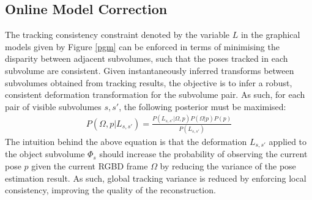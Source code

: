 \subsection{Online Model Correction}
\label{subsec:onlinemodelcorrection}

The tracking consistency constraint denoted by the variable $L$ in the graphical models given by Figure \ref{pgm} can 
be enforced in terms of minimising the disparity between adjacent subvolumes, such that the poses tracked in each subvolume are consistent.  
Given instantaneously inferred transforms between subvolumes obtained from tracking results, 
the objective is to infer a robust, consistent deformation transformation for the subvolume pair.
As such, for each pair of visible subvolumes $s, s'$, the following posterior must be maximised:
\begin{equation}
\begin{split}
P(\Omega, p | L_{s, s'}) = \frac{P(L_{s, s'} | \Omega, p) P(\Omega | p)P(p)}
{P(L_{s, s'})}
\end{split}
\end{equation}
The intuition behind the above equation is that the deformation $L_{s, s'}$ applied to the object subvolume $\Phi_{s}$ should 
increase the probability of observing the current pose $p$ given the current RGBD frame $\Omega$ by reducing the 
variance of the pose estimation result. As such, global tracking variance is reduced by enforcing local consistency, improving the quality 
of the reconstruction.

